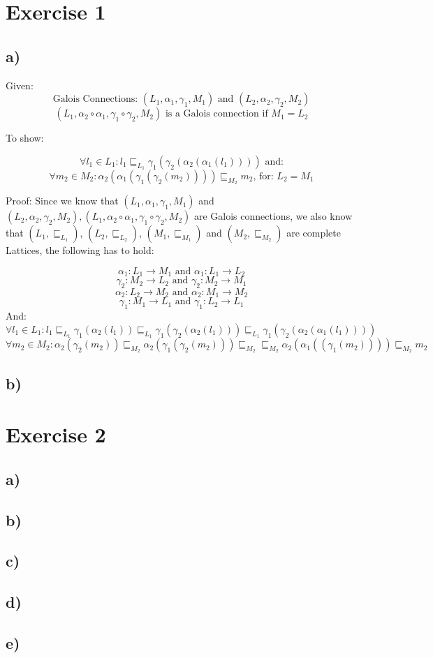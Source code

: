 \documentclass[fleqn,12pt]{article}
\begin{document}
\section*{Exercise 1}
\subsection*{a)}
Given:
$$\text{Galois Connections: } (L_1, \alpha_1, \gamma_1, M_1) \text{ and } (L_2, \alpha_2, \gamma_2, M_2)$$
$$(L_1, \alpha_2 \circ \alpha_1, \gamma_1 \circ \gamma_2,  M_2) \text{ is a Galois connection if } M_1 = L_2$$

To show:

$$\forall l_1 \in L_1: l_1 \sqsubseteq_{L_1} \gamma_1(\gamma_2(\alpha_2(\alpha_1(l_1)))) \text{ and:}$$
$$\forall m_2 \in M_2: \alpha_2(\alpha_1(\gamma_1(\gamma_2(m_2))))  \sqsubseteq_{M_2} m_2 \text{, for: } L_2 = M_1$$

Proof:
Since we know that $(L_1, \alpha_1, \gamma_1, M_1)$ and $(L_2, \alpha_2, \gamma_2, M_2), 
(L_1, \alpha_2 \circ \alpha_1, \gamma_1 \circ \gamma_2,  M_2)$ are Galois connections, we also know that $(L_1, \sqsubseteq_{L_1})$, $(L_2, \sqsubseteq_{L_2})$, $(M_1, \sqsubseteq_{M_1})$ and $(M_2, \sqsubseteq_{M_2})$ are complete Lattices, the following has to hold:

$$\alpha_1:L_1 \rightarrow M_1 \text{ and } \alpha_1:L_1 \rightarrow L_2$$
$$\gamma_2:M_2 \rightarrow L_2 \text{ and } \gamma_2:M_2 \rightarrow M_1$$
$$\alpha_2:L_2 \rightarrow M_2 \text{ and } \alpha_2:M_1 \rightarrow M_2$$
$$\gamma_1:M_1 \rightarrow L_1 \text{ and } \gamma_1:L_2 \rightarrow L_1$$
And:
$$\forall l_1 \in L_1:l_1\sqsubseteq_{L_1} \gamma_1(\alpha_2(l_1)) \sqsubseteq_{L_1} \gamma_1(\gamma_2(\alpha_2(l_1))) \sqsubseteq_{L_1} \gamma_1(\gamma_2(\alpha_2(\alpha_1(l_1))))$$
$$\forall m_2 \in M_2:\alpha_2(\gamma_2(m_2))\sqsubseteq_{M_2} \alpha_2(\gamma_1(\gamma_2(m_2)))\sqsubseteq_{M_2} \sqsubseteq_{M_2} \alpha_2(\alpha_1((\gamma_1(m_2))))\sqsubseteq_{M_2} m_2$$

\subsection*{b)}


\section*{Exercise 2}
\subsection*{a)}

\subsection*{b)}

\subsection*{c)}

\subsection*{d)}

\subsection*{e)}
\end{document}
